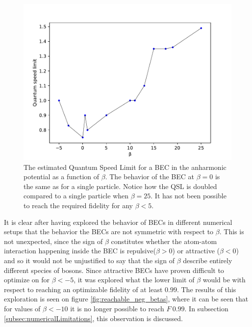 \documentclass[aps,pra,reprint,superscriptaddress]{revtex4-1}
\begin{document}
\begin{figure}[h]
	\includegraphics[width=\columnwidth]{graphics/QSL.pdf}
	\caption{The estimated Quantum Speed Limit for a BEC in the anharmonic potential as a function of $\beta$. The behavior of the BEC at $\beta=0$ is the same as for a single particle. Notice how the QSL is doubled compared to a single particle when $\beta=25$. It has not been possible to reach the required fidelity for any $\beta < 5$.}
	\label{fig:QSL}
\end{figure}

It is clear after having explored the behavior of BECs in different numerical setups that the behavior the BECs are not symmetric with respect to $\beta$. This is not unexpected, since the sign of $\beta$ constitutes whether the atom-atom interaction happening inside the BEC is repulsive($\beta>0$) or attractive ($\beta<0$) and so it would not be unjustified to say that the sign of $\beta$ describe entirely different species of bosons. Since attractive BECs have proven difficult to optimize on for $\beta<-5$, it was explored what the lower limit of $\beta$ would be with respect to reaching an optimizable fidelity of at least $0.99$. The results of this exploration is seen on figure \ref{fig:reachable_neg_betas}, where it can be seen that for values of $\beta<-10$ it is no longer possible to reach $F~0.99$. In subsection \ref{subsec:numericalLimitations}, this observation is discussed.
\end{document}
